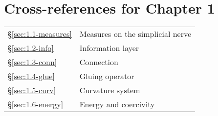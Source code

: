 \section*{Cross-references for Chapter 1}
\begin{center}
\begin{tabular}{ll}
§\ref{sec:1.1-measures} & Measures on the simplicial nerve \\
§\ref{sec:1.2-info} & Information layer \\
§\ref{sec:1.3-conn} & Connection \\
§\ref{sec:1.4-glue} & Gluing operator \\
§\ref{sec:1.5-curv} & Curvature system \\
§\ref{sec:1.6-energy} & Energy and coercivity \\
\end{tabular}
\end{center}

\newcommand{\placeholder}[1]{}
\label{sec:1.1-measures}\placeholder{}
\label{sec:1.2-info}\placeholder{}
\label{sec:1.3-conn}\placeholder{}
\label{sec:1.4-glue}\placeholder{}
\label{sec:1.5-curv}\placeholder{}
\label{sec:1.6-energy}\placeholder{}



